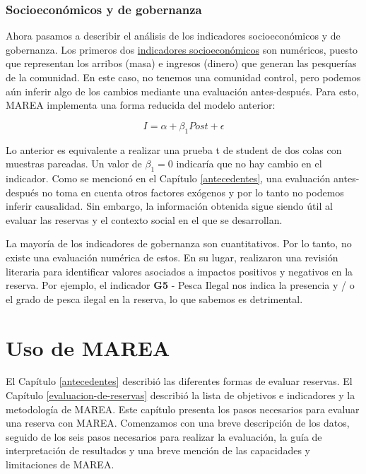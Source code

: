 \documentclass[]{krantz}
\begin{document}
\hypertarget{socioeconomicos-y-de-gobernanza}{%
\subsection{Socioeconómicos y de gobernanza}\label{socioeconomicos-y-de-gobernanza}}

Ahora pasamos a describir el análisis de los indicadores socioeconómicos y de gobernanza. Los primeros dos \protect\hyperlink{objetivos-e-indicadores}{indicadores socioeconómicos} son numéricos, puesto que representan los arribos (masa) e ingresos (dinero) que generan las pesquerías de la comunidad. En este caso, no tenemos una comunidad control, pero podemos aún inferir algo de los cambios mediante una evaluación antes-después. Para esto, MAREA implementa una forma reducida del modelo anterior:

\[
I = \alpha + \beta_1Post + \epsilon
\]

Lo anterior es equivalente a realizar una prueba t de student de dos colas con muestras pareadas. Un valor de \(\beta_1 = 0\) indicaría que no hay cambio en el indicador. Como se mencionó en el Capítulo \ref{antecedentes}, una evaluación antes-después no toma en cuenta otros factores exógenos y por lo tanto no podemos inferir causalidad. Sin embargo, la información obtenida sigue siendo útil al evaluar las reservas y el contexto social en el que se desarrollan.

La mayoría de los indicadores de gobernanza son cuantitativos. Por lo tanto, no existe una evaluación numérica de estos. En su lugar, \citet{villasenorderbez_2018} realizaron una revisión literaria para identificar valores asociados a impactos positivos y negativos en la reserva. Por ejemplo, el indicador \textbf{G5} - Pesca Ilegal nos indica la presencia y / o el grado de pesca ilegal en la reserva, lo que sabemos es detrimental.

\hypertarget{uso-de-marea}{%
\chapter{Uso de MAREA}\label{uso-de-marea}}

El Capítulo \ref{antecedentes} describió las diferentes formas de evaluar reservas. El Capítulo \ref{evaluacion-de-reservas} describió la lista de objetivos e indicadores y la metodología de MAREA. Este capítulo presenta los pasos necesarios para evaluar una reserva con MAREA. Comenzamos con una breve descripción de los datos, seguido de los seis pasos necesarios para realizar la evaluación, la guía de interpretación de resultados y una breve mención de las capacidades y limitaciones de MAREA.
\end{document}
